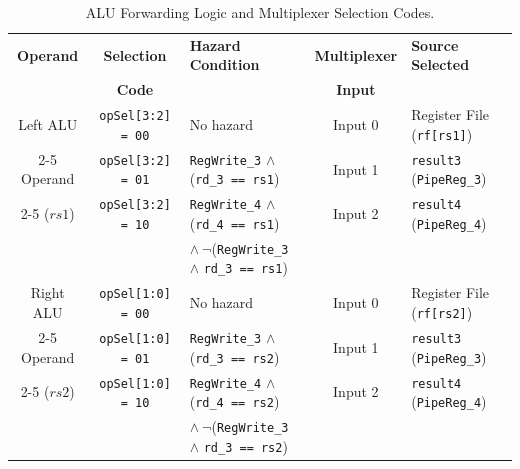 \begin{table}[H]
  \begin{center}
    \caption{ALU Forwarding Logic and Multiplexer Selection Codes.}
    \label{tab:forwarding_logic}
    \small
    \begin{tabular}{|c|c|l|c|l|}
      \hline
      \textbf{Operand} & \textbf{Selection} & \textbf{Hazard Condition} & \textbf{Multiplexer} & \textbf{Source Selected} \\ 
                       & \textbf{Code}      &                           & \textbf{Input}       &                          \\ \hline \hline
      Left ALU  & \texttt{opSel[3:2] = 00} & No hazard                                            & Input 0 & Register File (\texttt{rf[rs1]}) \\ \cline{2-5}
      Operand   & \texttt{opSel[3:2] = 01} & \texttt{RegWrite\_3} $\land$ (\texttt{rd\_3 == rs1})  & Input 1 & \texttt{result3} (\texttt{PipeReg\_3}) \\ \cline{2-5}
      ($rs1$)   & \texttt{opSel[3:2] = 10} & \texttt{RegWrite\_4} $\land$ (\texttt{rd\_4 == rs1})  & Input 2 & \texttt{result4} (\texttt{PipeReg\_4}) \\ 
                &                          & $\land\ \neg$(\texttt{RegWrite\_3} $\land$ \texttt{rd\_3 == rs1}) & & \\ \hline \hline
      Right ALU & \texttt{opSel[1:0] = 00} & No hazard                                            & Input 0 & Register File (\texttt{rf[rs2]}) \\ \cline{2-5}
      Operand   & \texttt{opSel[1:0] = 01} & \texttt{RegWrite\_3} $\land$ (\texttt{rd\_3 == rs2})  & Input 1 & \texttt{result3} (\texttt{PipeReg\_3}) \\ \cline{2-5}
      ($rs2$)   & \texttt{opSel[1:0] = 10} & \texttt{RegWrite\_4} $\land$ (\texttt{rd\_4 == rs2})  & Input 2 & \texttt{result4} (\texttt{PipeReg\_4}) \\ 
                &                          & $\land\ \neg$(\texttt{RegWrite\_3} $\land$ \texttt{rd\_3 == rs2}) & & \\ \hline
    \end{tabular}
  \end{center}
\end{table}

